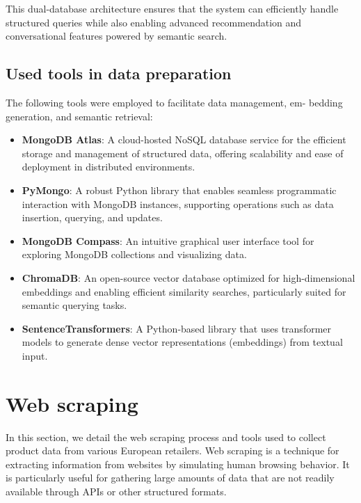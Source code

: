 This dual-database architecture ensures that the system can efficiently
handle structured queries while also enabling advanced recommendation
and conversational features powered by semantic search.

\subsection{Used tools in data preparation}
The following tools were employed to facilitate data management, em-
bedding generation, and semantic retrieval:

\begin{itemize}[label=\textbf{-}]
    \item \textbf{MongoDB Atlas}: A cloud-hosted NoSQL database service for the efficient storage and management of structured data, offering scalability and ease of deployment in distributed environments.
    \item \textbf{PyMongo}: A robust Python library that enables seamless programmatic interaction with MongoDB instances, supporting operations such as data insertion, querying, and updates.
    \item \textbf{MongoDB Compass}: An intuitive graphical user interface tool for exploring MongoDB collections and visualizing data.
    \item \textbf{ChromaDB}: An open-source vector database optimized for high-dimensional embeddings and enabling efficient similarity searches, particularly suited for semantic querying tasks.
    \item \textbf{SentenceTransformers}: A Python-based library that uses transformer models to generate dense vector representations (embeddings) from textual input.
\end{itemize}


\section{Web scraping}
\par In this section, we detail the web scraping process and tools used to
collect product data from various European retailers. Web scraping is a
technique for extracting information from websites by simulating human
browsing behavior. It is particularly useful for gathering large amounts
of data that are not readily available through APIs or other structured
formats.

